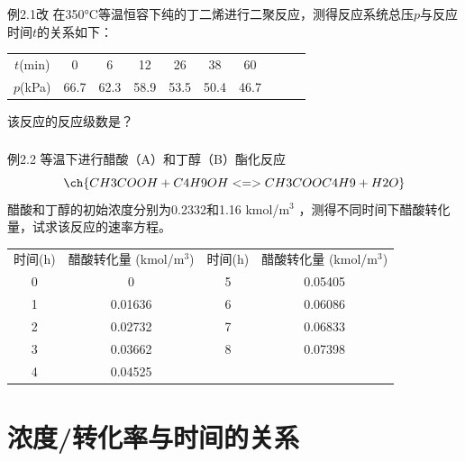 \begin{frame}[t]
    \frametitle{}
    \begin{block}{例2.1改}
        在350°C等温恒容下纯的丁二烯进行二聚反应，测得反应系统总压$p$与反应时间$t$的关系如下：
        \begin{table}[]
            \begin{tabular}{cccccccccc}
                $t$(min)    & 0   & 6    & 12    & 26    & 38    & 60 \\
                $p$(kPa)    & 66.7 & 62.3 & 58.9 & 53.5 & 50.4 & 46.7 
            \end{tabular}
        \end{table}
        该反应的反应级数是？
    \end{block}
\end{frame}


\begin{frame}
    \frametitle{}
    \begin{block}{例2.2}
        等温下进行醋酸（A）和丁醇（B）酯化反应
        \[
            \ch{CH3COOH + C4H9OH <=> CH3COOC4H9 + H2O}
        \]
        醋酸和丁醇的初始浓度分别为0.2332和1.16 kmol/m$^3$ ，测得不同时间下醋酸转化量，试求该反应的速率方程。
        \begin{table}[]
            \begin{tabular}{cc|cc}
            时间(h)    & 醋酸转化量 (kmol/m$^3$) & 时间(h)    & 醋酸转化量 (kmol/m$^3$)  \\
            0 & 0        &  5 &  0.05405 \\
            1 & 0.01636  &  6 & 0.06086  \\
            2 & 0.02732  &  7 & 0.06833  \\
            3 & 0.03662  &  8 & 0.07398  \\
            4 & 0.04525  &   &   
            \end{tabular}
        \end{table}
        \vspace{-1em}
    \end{block}
\end{frame}



\section{浓度/转化率与时间的关系}


